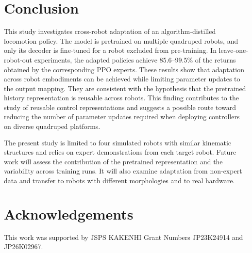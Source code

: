 \documentclass[runningheads]{llncs}
\begin{document}
\section{Conclusion}
\label{conclusion}
This study investigates cross-robot adaptation of an algorithm-distilled locomotion policy. 
The model is pretrained on multiple quadruped robots, and only its decoder is fine-tuned for a robot excluded from pre-training.
In leave-one-robot-out experiments, the adapted policies achieve 85.6--99.5\% of the returns obtained by the corresponding PPO experts.
These results show that adaptation across robot embodiments can be achieved while limiting parameter updates to the output mapping.
They are consistent with the hypothesis that the pretrained history representation is reusable across robots.
This finding contributes to the study of reusable control representations and suggests a possible route toward reducing the number of parameter updates required when deploying controllers on diverse quadruped platforms.

The present study is limited to four simulated robots with similar kinematic structures and relies on expert demonstrations from each target robot.
Future work will assess the contribution of the pretrained representation and the variability across training runs. It will also examine adaptation from non-expert data and transfer to robots with different morphologies and to real hardware.


\section*{Acknowledgements}

This work was supported by JSPS KAKENHI Grant Numbers JP23K24914 and JP26K02967.





\end{document}
